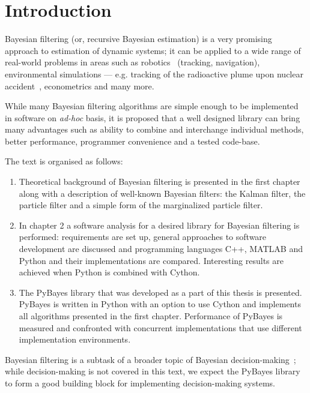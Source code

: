 \clearpage %
\chapter*{Introduction}

Bayesian filtering (or, recursive Bayesian estimation) is a very promising approach to estimation
of dynamic systems; it can be applied to a wide range of real-world problems in areas such as
robotics~\cite{ThrBurFox:05,Gus:02} (tracking, navigation), environmental simulations ---
e.g. tracking of the radioactive plume upon nuclear
accident~\cite{HofSmi:09,HofSmiPech:09,PechHofSmi:09}, econometrics and many more.

While many Bayesian filtering algorithms are simple enough to be implemented in software on
\emph{ad-hoc} basis, it is proposed that a well designed library can bring many advantages such as
ability to combine and interchange individual methods, better performance, programmer convenience
and a tested code-base.

\noindent{}The text is organised as follows:
\begin{enumerate}
	\item Theoretical background of Bayesian filtering is presented in the first chapter along with
	a description of well-known Bayesian filters: the Kalman filter, the particle filter and a
	simple form of the marginalized particle filter.
	\item In chapter 2 a software analysis for a desired library for Bayesian filtering is
	performed: requirements are set up, general approaches to software development are discussed and
	programming languages C++, MATLAB and Python and their implementations are compared. Interesting
	results are achieved when Python is combined with Cython.
	\item The PyBayes library that was developed as a part of this thesis is presented. PyBayes is
	written in Python with an option to use Cython and implements all algorithms presented in the
	first chapter. Performance of PyBayes is measured and confronted with concurrent implementations
	that use different implementation environments.
\end{enumerate}
Bayesian filtering is a subtask of a broader topic of Bayesian decision-making~\cite{Smi:05}; while
decision-making is not covered in this text, we expect the PyBayes library to form a good building
block for implementing decision-making systems.
